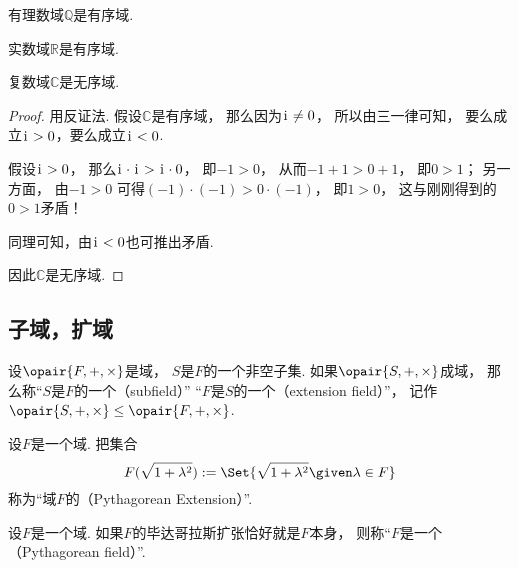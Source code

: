 \begin{theorem}
有理数域\(\mathbb{Q}\)是有序域.
\end{theorem}

\begin{theorem}
实数域\(\mathbb{R}\)是有序域.
\end{theorem}

\begin{theorem}
复数域\(\mathbb{C}\)是无序域.
\begin{proof}
用反证法.
假设\(\mathbb{C}\)是有序域，
那么因为\(\kern1pt\mathrm{i}\kern1pt\neq0\)，
所以由三一律可知，
要么成立\(\kern1pt\mathrm{i}\kern1pt>0\)，要么成立\(\kern1pt\mathrm{i}\kern1pt<0\).

假设\(\kern1pt\mathrm{i}\kern1pt>0\)，
那么\(\kern1pt\mathrm{i}\kern1pt\cdot\kern1pt\mathrm{i}\kern1pt>\kern1pt\mathrm{i}\kern1pt\cdot0\)，
即\(-1>0\)，
从而\(-1+1>0+1\)，
即\(0>1\)；
另一方面，
由\(-1>0\)
可得\((-1)\cdot(-1)>0\cdot(-1)\)，
即\(1>0\)，
这与刚刚得到的\(0>1\)矛盾！

同理可知，由\(\kern1pt\mathrm{i}\kern1pt<0\)也可推出矛盾.

因此\(\mathbb{C}\)是无序域.
\end{proof}
\end{theorem}

\subsection{子域，扩域}
\begin{definition}
设\(\opair{F,+,\times}\)是域，
\(S\)是\(F\)的一个非空子集.
如果\(\opair{S,+,\times}\)成域，
那么称“\(S\)是\(F\)的一个（subfield）”
“\(F\)是\(S\)的一个（extension field）”，
记作\(\opair{S,+,\times}\AlgebraSubstructure\opair{F,+,\times}\).
\end{definition}

\begin{definition}
设\(F\)是一个域.
把集合\begin{equation*}
	F(\sqrt{1+\lambda^2})
	\defeq
	\Set{
		\sqrt{1+\lambda^2}
		\given
		\lambda \in F
	}
\end{equation*}
称为“域\(F\)的（Pythagorean Extension）”.
\end{definition}

\begin{definition}
设\(F\)是一个域.
如果\(F\)的毕达哥拉斯扩张恰好就是\(F\)本身，
则称“\(F\)是一个（Pythagorean field）”.
\end{definition}

